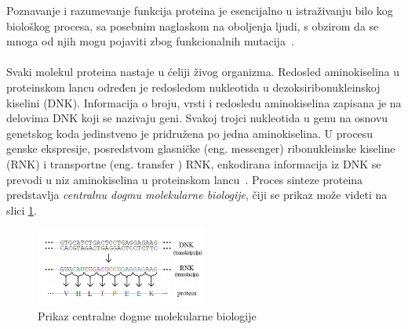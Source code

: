 Poznavanje i razumevanje funkcija proteina je esencijalno u istraživanju bilo kog biološkog procesa, sa posebnim naglaskom na oboljenja ljudi, s obzirom da
se mnoga od njih mogu pojaviti zbog funkcionalnih mutacija~\cite{JKd}.\\\\
Svaki molekul proteina nastaje u ćeliji živog organizma. Redosled aminokiselina u proteinskom lancu određen je redosledom nukleotida u dezoksiribonukleinskoj kiselini (DNK). Informacija o broju, vrsti i redosledu aminokiselina zapisana je na delovima DNK koji se nazivaju geni. Svakoj trojci nukleotida u genu na osnovu genetskog koda jedinstveno je pridružena po jedna aminokiselina. U procesu genske ekspresije, posredstvom glasničke
(eng. messenger) ribonukleinske kiseline (RNK) i transportne (eng. transfer
) RNK, enkodirana informacija iz DNK se prevodi u niz aminokiselina u
proteinskom lancu~\cite{JKd}.
Proces sinteze proteina predstavlja \textit{centralnu dogmu molekularne biologije}, čiji se prikaz može videti na slici \ref{fig:dogma}.
\begin{figure}[h]
	\centering
    \includegraphics[width=0.5\textwidth]{Figures/BO/dogma.png}
    \caption{Prikaz centralne dogme molekularne biologije~\cite{JKd}}
    \label{fig:dogma}
\end{figure}

